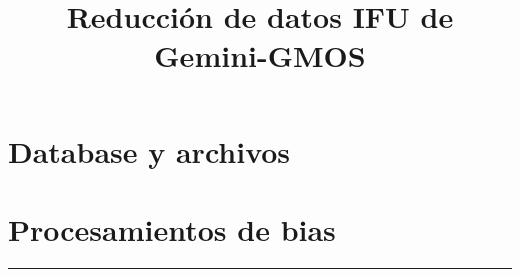 \documentclass[12pt]{article}
\title{\textbf{Reducción de datos IFU de Gemini-GMOS}}
\author{ \href{ mailto:\autorxmail}{ \autorx }}
\begin{document}
\setlength{\headheight}{13.59999pt}
\thispagestyle{fancy}
\maketitle





\section{Database y archivos}


\section{Procesamientos de bias}




\textcolor{medio}{\hrule} 





\end{document}
